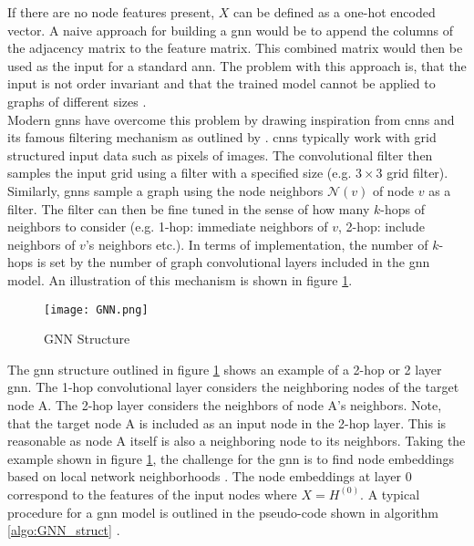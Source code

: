 	\noindent If there are no node features present, $X$ can be defined as a 
	one-hot encoded vector. A naive approach for building a \acs{gnn} would be to
	append the columns of the adjacency matrix to the feature matrix. This
	combined matrix would then be used as the input for a standard \acs{ann}. 
	The problem with this approach is, that the input is not order invariant and 
	that the trained model cannot be applied to graphs of different sizes 
	\citep{leskovec2021lecture}. \\

	\noindent Modern \acsp{gnn} have overcome this problem by drawing inspiration 
	from \acp{cnn} and its famous filtering mechanism as outlined by 
	\cite{krizhevsky2012imagenet}. \acsp{cnn} typically work with grid 
	structured input data such as pixels of images. The convolutional filter 
	then samples the input grid using a filter with a specified size 
	(e.g. $3\times3$ grid filter). Similarly, \acsp{gnn} sample a graph using 
	the node neighbors $\mathcal{N}(v)$ of node $v$ as a filter. The filter can 
	then be fine tuned in the sense of how many $k$-hops of neighbors to consider 
	(e.g. 1-hop: immediate neighbors of $v$, 2-hop: include neighbors of $v$'s 
	neighbors etc.). In terms of implementation, the number of $k$-hops is set 
	by the number of graph convolutional layers included in the \acs{gnn} model. 
	An illustration of this mechanism is shown in figure \ref{fig:GNN_structure}. \\

	\begin{figure}[h]
		\centering
		\texttt{[image: GNN.png]}
		\caption{GNN Structure}
		\cite{leskovec2021lecture}
		\label{fig:GNN_structure}
	\end{figure}

	\noindent The \acs{gnn} structure outlined in figure \ref{fig:GNN_structure} 
	shows an example of a 2-hop or 2 layer \acs{gnn}. The 1-hop convolutional layer 
	considers the neighboring nodes of the target node A. The 2-hop layer 
	considers the neighbors of node A's neighbors. Note, that the target node A 
	is included as an input node in the 2-hop layer. This is reasonable as node 
	A itself is also a neighboring node to its neighbors. Taking the example 
	shown in figure \ref{fig:GNN_structure}, the challenge for the \acs{gnn} is to 
	find node embeddings based on local network neighborhoods \citep{leskovec2021lecture}. 
	The node embeddings at layer 0 correspond to the features of the input nodes 
	where $X = H^{(0)}$. A typical procedure for a \acs{gnn} model is outlined 
	in the pseudo-code shown in algorithm \ref{algo:GNN_struct} 
	\citep{hamilton2017inductive,leskovec2021lecture,you2020design}.	

